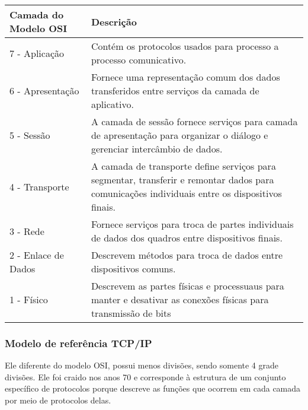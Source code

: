 \documentclass[12pt a4paper]{paper}
\begin{document}
\newpage

\begin{center}
  \begin{tabular}{| m{3cm} | m{7cm} |}
  \hline
  \textbf{Camada do Modelo OSI} & \textbf{Descrição} \\
  \hline
  7 - Aplicação & Contém os protocolos usados para processo a processo comunicativo. \\
  \hline
  6 - Apresentação & Fornece uma representação comum dos dados transferidos entre serviços da camada de aplicativo. \\ 
  \hline
  5 - Sessão & A camada de sessão fornece serviços para camada de apresentação para organizar o diálogo e gerenciar intercâmbio de dados. \\
  \hline
  4 - Transporte & A camada de transporte define serviços para segmentar, transferir e remontar dados para comunicações individuais entre os dispositivos finais. \\
  \hline
  3 - Rede & Fornece serviços para troca de partes individuais de dados dos quadros entre dispositivos finais. \\
  \hline
  2 - Enlace de Dados & Descrevem métodos para troca de dados entre dispositivos comuns.\\
  \hline  
  1 - Físico & Descrevem as partes físicas e processuaus para manter e desativar as conexões físicas para transmissão de bits \\

 
\hline
\end{tabular}
\end{center}

\subsubsection{Modelo de referência TCP/IP} %
\label{sec:Modelo de referência TCP/IP}
Ele diferente do modelo OSI, possui menos divisões, sendo somente 4 grade divisões. Ele
foi craido nos anos 70 e corresponde à estrutura de um conjunto específico de protocolos
 porque descreve as funções que ocorrem em cada camada por meio de protocolos delas. 
\end{document}
